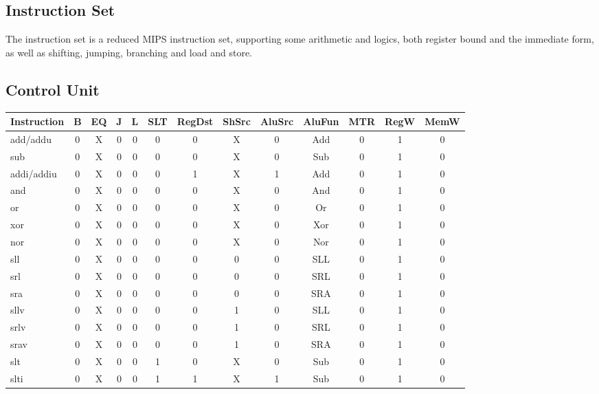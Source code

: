 \subsection{Instruction Set}
The instruction set is a reduced MIPS instruction set, supporting some
arithmetic and logics, both register bound and the immediate form, as well as
shifting, jumping, branching and load and store.

\subsection{Control Unit}

\begin{table}[ht]
    \begin{tabular}{|l|c|c|c|c|c|c|c|c|c|c|c|c|}
        \hline
        Instruction & B & EQ & J & L & SLT & RegDst & ShSrc & AluSrc & AluFun & MTR & RegW & MemW \\
        \hline
        add/addu   & 0 & X & 0 & 0 & 0 & 0 & X & 0 & Add & 0 & 1 & 0 \\
        sub        & 0 & X & 0 & 0 & 0 & 0 & X & 0 & Sub & 0 & 1 & 0 \\
        addi/addiu & 0 & X & 0 & 0 & 0 & 1 & X & 1 & Add & 0 & 1 & 0 \\
        \hline
        and        & 0 & X & 0 & 0 & 0 & 0 & X & 0 & And & 0 & 1 & 0 \\
        or         & 0 & X & 0 & 0 & 0 & 0 & X & 0 & Or  & 0 & 1 & 0 \\
        xor        & 0 & X & 0 & 0 & 0 & 0 & X & 0 & Xor & 0 & 1 & 0 \\
        nor        & 0 & X & 0 & 0 & 0 & 0 & X & 0 & Nor & 0 & 1 & 0 \\
        \hline
        sll        & 0 & X & 0 & 0 & 0 & 0 & 0 & 0 & SLL & 0 & 1 & 0 \\
        srl        & 0 & X & 0 & 0 & 0 & 0 & 0 & 0 & SRL & 0 & 1 & 0 \\
        sra        & 0 & X & 0 & 0 & 0 & 0 & 0 & 0 & SRA & 0 & 1 & 0 \\
        sllv       & 0 & X & 0 & 0 & 0 & 0 & 1 & 0 & SLL & 0 & 1 & 0 \\
        srlv       & 0 & X & 0 & 0 & 0 & 0 & 1 & 0 & SRL & 0 & 1 & 0 \\
        srav       & 0 & X & 0 & 0 & 0 & 0 & 1 & 0 & SRA & 0 & 1 & 0 \\
        \hline
        slt        & 0 & X & 0 & 0 & 1 & 0 & X & 0 & Sub & 0 & 1 & 0 \\
        slti       & 0 & X & 0 & 0 & 1 & 1 & X & 1 & Sub & 0 & 1 & 0 \\

\end{tabular}
\end{table}
